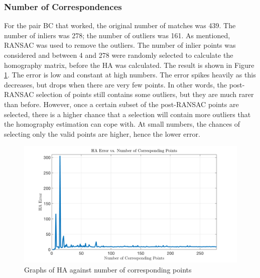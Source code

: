 \documentclass[a4paper, 10pt, conference]{ieeeconf}
\begin{document}


\subsubsection{Number of Correspondences}


For the pair BC that worked, the original number of matches was 439. The number of inliers was 278; the number of outliers was 161. As mentioned, RANSAC was used to remove the outliers. The number of inlier points was considered and between 4 and 278 were randomly selected to calculate the homography matrix, before the HA was calculated. The result is shown in Figure \ref{fig:outliers}. The error is low and constant at high numbers. The error spikes heavily as this decreases, but drops when there are very few points. In other words, the post-RANSAC selection of points still contains some outliers, but they are much rarer than before. However, once a certain subset of the post-RANSAC points are selected, there is a higher chance that a selection will contain more outliers that the homography estimation can cope with. At small numbers, the chances of selecting only the valid points are higher, hence the lower error.


\begin{figure}[!ht]
  \centering
  \includegraphics[width=0.75\linewidth]{pic/q2_1_c}
  \caption{Graphs of HA against number of corresponding points}
  \vspace{-0.5cm}
  \label{fig:outliers}
\end{figure}
\end{document}
